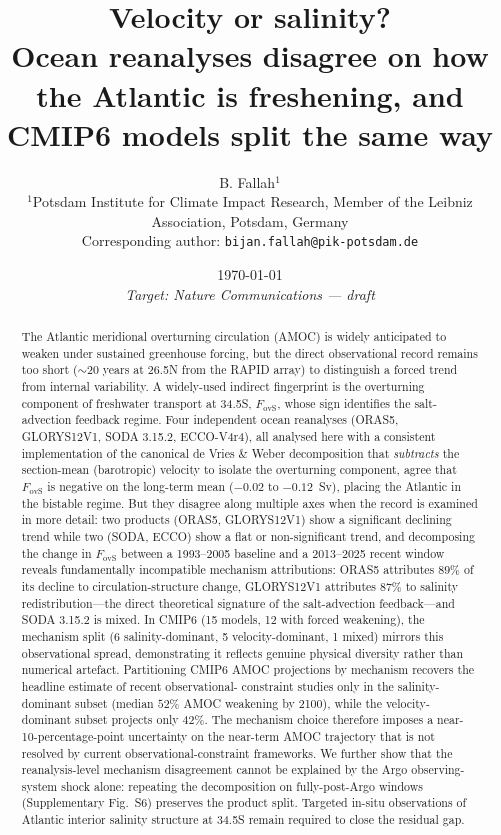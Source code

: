 \documentclass[12pt,a4paper]{article}
\title{\textbf{Velocity or salinity?\\Ocean reanalyses disagree on
how the Atlantic is freshening, and CMIP6 models split the same way}}
\author{B. Fallah$^{1}$ \\
{\small $^{1}$Potsdam Institute for Climate Impact Research,
  Member of the Leibniz Association, Potsdam, Germany}\\[4pt]
{\small Corresponding author: \texttt{bijan.fallah@pik-potsdam.de}}}
\date{\today \\ \emph{Target: Nature Communications --- draft}}
\newcommand{\Fovs}{F_\mathrm{ovS}}
\begin{document}
\maketitle

\begin{abstract}
The Atlantic meridional overturning circulation (AMOC) is widely
anticipated to weaken under sustained greenhouse forcing, but the direct
observational record remains too short (${\sim}20$ years at 26.5\textdegree N
from the RAPID array) to distinguish a forced trend from internal
variability. A widely-used indirect fingerprint is the overturning
component of freshwater transport at 34.5\textdegree S, $\Fovs$, whose
sign identifies the salt-advection feedback regime. Four independent
ocean reanalyses (ORAS5, GLORYS12V1, SODA 3.15.2, ECCO-V4r4), all
analysed here with a consistent implementation of the canonical de
Vries \& Weber decomposition that \emph{subtracts} the
section-mean (barotropic) velocity to isolate the overturning
component, agree that $\Fovs$ is negative on the long-term mean
(${-0.02}$ to ${-0.12}$~Sv), placing the Atlantic in the bistable
regime. But they disagree along multiple axes when the record is
examined in more detail: two products (ORAS5, GLORYS12V1) show a
significant declining trend while two (SODA, ECCO) show a flat or
non-significant trend, and decomposing the change in $\Fovs$
between a 1993--2005 baseline and a 2013--2025 recent window
reveals fundamentally incompatible mechanism attributions: ORAS5
attributes $89\%$ of its decline to circulation-structure change,
GLORYS12V1 attributes $87\%$ to salinity redistribution---the
direct theoretical signature of the salt-advection feedback---and
SODA 3.15.2 is mixed. In CMIP6 (15 models, 12 with forced
weakening), the mechanism split (6 salinity-dominant, 5
velocity-dominant, 1 mixed) mirrors this observational spread,
demonstrating it reflects genuine physical diversity rather than
numerical artefact. Partitioning CMIP6 AMOC projections by
mechanism recovers the headline estimate of recent observational-%
constraint studies \citep{Portmann2026} only in the
salinity-dominant subset (median $52\%$ AMOC weakening by 2100),
while the velocity-dominant subset projects only $42\%$. The
mechanism choice therefore imposes a near-10-percentage-point
uncertainty on the near-term AMOC trajectory that is not resolved
by current observational-constraint frameworks. We further show
that the reanalysis-level mechanism disagreement cannot be
explained by the Argo observing-system shock alone: repeating the
decomposition on fully-post-Argo windows (Supplementary
Fig.~S6) preserves the product split. Targeted in-situ observations
of Atlantic interior salinity structure at 34.5\textdegree S
remain required to close the residual gap.
\end{abstract}
\end{document}
